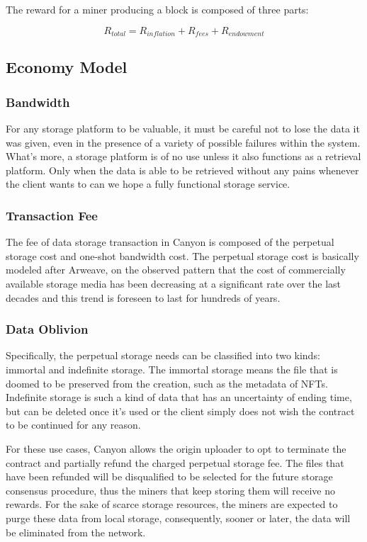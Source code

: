 \documentclass[]{article}
\newcounter{subsubsubsection}[subsubsection]
\begin{document}

The reward for a miner producing a block is composed of three parts:

$$
R_{total} = R_{inflation} + R_{fees} + R_{endowment}
$$

\subsection{Economy Model}

\subsubsection{Bandwidth}

For any storage platform to be valuable, it must be careful not to lose the data it was given, even in the presence of a variety of possible failures within the system. What's more, a storage platform is of no use unless it also functions as a retrieval platform. Only when the data is able to be retrieved without any pains whenever the client wants to can we hope a fully functional storage service.

\subsubsection{Transaction Fee}

The fee of data storage transaction in Canyon is composed of the perpetual storage cost and one-shot bandwidth cost. The perpetual storage cost is basically modeled after Arweave, on the observed pattern that the cost of commercially available storage media has been decreasing at a significant rate over the last decades and this trend is foreseen to last for hundreds of years.

\subsubsection{Data Oblivion}

Specifically, the perpetual storage needs can be classified into two kinds: immortal and indefinite storage. The immortal storage means the file that is doomed to be preserved from the creation, such as the metadata of NFTs. Indefinite storage is such a kind of data that has an uncertainty of ending time, but can be deleted once it's used or the client simply does not wish the contract to be continued for any reason.

For these use cases, Canyon allows the origin uploader to opt to terminate the contract and partially refund the charged perpetual storage fee. The files that have been refunded will be disqualified to be selected for the future storage consensus procedure, thus the miners that keep storing them will receive no rewards. For the sake of scarce storage resources, the miners are expected to purge these data from local storage, consequently, sooner or later, the data will be eliminated from the network.
\end{document}

